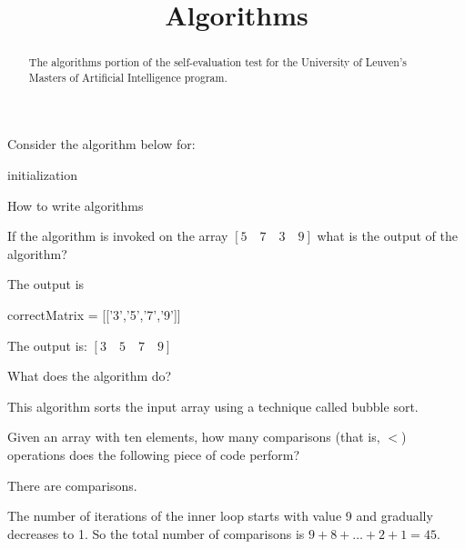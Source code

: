 \documentclass{ximera}
\title{Algorithms}
\begin{document}
\begin{abstract}
The algorithms portion of the self-evaluation test for the University
of Leuven's Masters of Artificial Intelligence program.
\end{abstract}
\maketitle

\begin{question}
Consider the algorithm below for: 


\begin{algorithm}[H]
initialization\;
\caption{How to write algorithms}
\end{algorithm}


If the algorithm is invoked on the array $[ 5\quad 7\quad 3\quad 9]$ what is the output of the algorithm?
\begin{solution}
The output is 
\begin{matrix-answer}[name=M]
    correctMatrix = [['3','5','7','9']]
\end{matrix-answer}
\end{solution}

The output is:
$ [3 \quad 5 \quad 7 \quad 9] $

What does the algorithm do? 
\begin{free-response}
\end{free-response}
This algorithm sorts the input array using a technique called bubble sort.

Given an array with ten elements, how many comparisons (that is, $<$)
operations does the following piece of code perform?
\begin{solution}
There are  comparisons.
\end{solution}  
The number of iterations of the inner loop starts with value 9 and
gradually decreases to 1. So the total number of comparisons is $ 9 +
8 + \ldots + 2 + 1 = 45$.


\end{question}
\end{document}
